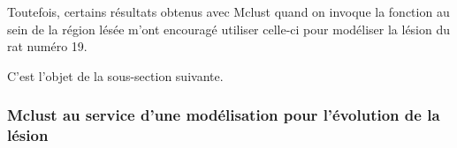 \etoile
Toutefois, certains r\'esultats obtenus avec Mclust quand on invoque la fonction au sein de la r\'egion l\'es\'ee %
m'ont encourag\'e  utiliser celle-ci pour mod\'eliser la l\'esion du rat num\'ero 19.

\par
C'est l'objet de la sous-section suivante.

\FloatBarrier
\subsubsection{Mclust au service d'une mod\'elisation pour l'\'evolution de la l\'esion}




